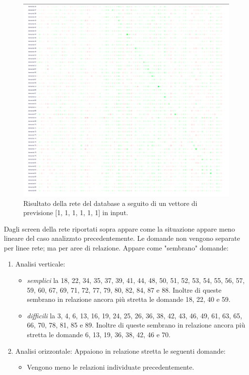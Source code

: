 \begin{itemize}
\begin{figure}[H]
\centering
	\includegraphics[width=0.90\linewidth]{./image/rete_db-vp1_2architettura2.png}
	\caption{Risultato della rete del database a seguito di un vettore di previsione [1, 1, 1, 1, 1, 1] in input.}
	\label{Risultato della rete del database a seguito di un vettore di previsione [1, 1, 1, 1, 1, 1] in input.}
\end{figure}
\noindent

Dagli screen della rete riportati sopra appare come la situazione appare meno lineare del caso analizzato precedentemente. 
Le domande non vengono separate per linee rete; ma per aree di relazione. Appare come "sembrano" domande:
\begin{enumerate}
\item Analisi verticale:
\begin{itemize}
\item \textit{semplici} la 18, 22, 34, 35, 37, 39, 41, 44, 48, 50, 51, 52, 53, 54, 55, 56, 57, 59, 60, 67, 69,  71, 72, 77, 79, 80, 82, 84, 87 e 88. Inoltre di queste sembrano in relazione ancora pi\`u stretta le domande 18, 22, 40 e 59.
\item \textit{difficili} la 3, 4, 6, 13, 16, 19, 24, 25, 26, 36, 38, 42, 43, 46, 49, 61, 63, 65, 66, 70, 78, 81, 85 e 89. Inoltre di queste sembrano in relazione ancora pi\`u stretta le domande 6, 13, 19, 36, 38, 42, 46 e 70.
\end{itemize}
\item Analisi orizzontale:
Appaiono in relazione stretta le seguenti domande:
\begin{itemize}
\item Vengono meno le relazioni individuate precedentemente.
\end{itemize}
\end{enumerate}
\noindent


\end{itemize}
